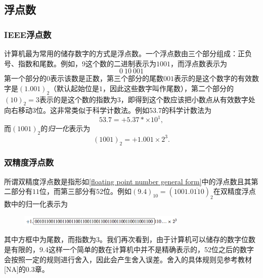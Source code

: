 \documentclass[10pt]{beamer}
\begin{document}
\subsection{浮点数}

\begin{frame}
\frametitle{IEEE浮点数}
计算机最为常用的储存数字的方式是浮点数。一个浮点数由三个部分组成：正负号、指数和尾数。例如，$9$这个数的二进制表示为$1001$，而浮点数表示为
\begin{equation}
0 \ 10 \ 001 
\label{floating point number general form}
\end{equation}
第一个部分的$0$表示该数是正数，第三个部分的尾数$001$表示的是这个数字的有效数字是$(1.001)_2$（默认起始位是$1$，因此这些数字叫作尾数），第二个部分的$(10)_2 = 3$表示的是这个数的指数为$3$，即得到这个数应该把小数点从有效数字处向右移动$3$位。这非常类似于科学计数法。例如53.7的科学计数法为
\begin{equation}
53.7 = + 5.37 *\times 10^1,
\end{equation}
而$(1001)_2$的\emph{归一化}表示为
\begin{equation}
(1001)_2 = + 1.001 \times 2^3.
\end{equation}


\end{frame}


\begin{frame}
\frametitle{双精度浮点数}
所谓双精度浮点数是指形如\eqref{floating point number general form}中的浮点数且其第二部分有$11$位，而第三部分有$52$位。例如$(9.4)_{10} = (1001.\overline{0110})_2$在双精度浮点数中的归一化表示为
\begin{figure}
\includegraphics[width=8cm]{figs/double_precision_9-4.png} 
\end{figure}
其中方框中为尾数，而指数为$3$。我们再次看到，由于计算机可以储存的数字位数是有限的，$9.4$这样一个简单的数在计算机中并不是精确表示的，52位之后的数字会按照一定的规则进行舍入，因此会产生舍入误差。舍入的具体规则见参考教材[NA]的0.3章。

\end{frame}
\end{document}
